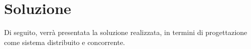 \chapter{Soluzione}

Di seguito, verrà presentata la soluzione realizzata, in termini di progettazione come sistema distribuito e concorrente.




